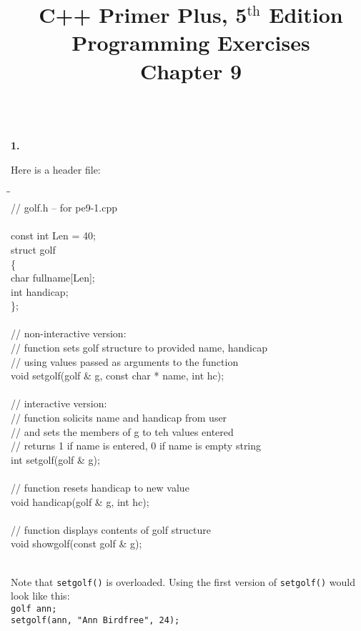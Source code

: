 \documentclass[10 pt]{amsart}
\newlength{\cwidth}
\newenvironment{cpart}[2][\cwidth]
	{\\ \noindent\phantom{\qquad}\textbf{#2. }\begin{minipage}[t]{#1}}
	{\end{minipage}}
\newcommand{\ttt}[1]{\texttt{#1}}
\newcommand{\ChapNum}{9}
\begin{document}
	\title
	[Chapter \ChapNum]
	{C++ Primer Plus, 5$^\text{th}$ Edition \\
	Programming Exercises \\
	Chapter \ChapNum}

	\maketitle

	\begin{cpart}{1}
		Here is a header file:
		{\ttfamily
			\begin{tabbing}
				\phantom{\qquad}\=\phantom{\qquad}\=\phantom{\qquad}\= \\
				// golf.h -- for pe9-1.cpp \\
				\\
				const int Len = 40; \\
				struct golf \\
				\{ \\
				\> 	char fullname[Len]; \\
				\> 	int handicap; \\
				\}; \\
				\\
				// non-interactive version: \\
				// function sets golf structure to provided name, handicap \\
				// using values passed as arguments to the function \\
				void setgolf(golf & g, const char * name, int hc); \\
				\\
				// interactive version: \\
				// function solicits name and handicap from user \\
				// and sets the members of g to teh values entered \\
				// returns 1 if name is entered, 0 if name is empty string \\
				int setgolf(golf & g); \\
				\\
				// function resets handicap to new value \\
				void handicap(golf & g, int hc); \\
				\\
				// function displays contents of golf structure \\
				void showgolf(const golf & g);
			\end{tabbing}
		}
		\phantom{\quad} \\
		Note that \ttt{setgolf()} is overloaded. 
		Using the first version of \ttt{setgolf()} would look like this:
		\vspace{2ex} \\
		\ttt{golf ann;} \\
		\ttt{setgolf(ann, "Ann Birdfree", 24);}
	\end{cpart}
	
\end{document}
